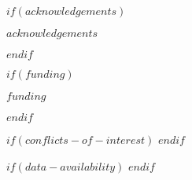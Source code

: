 $if(acknowledgements)$
\begin{acknowledgements}
$acknowledgements$
\end{acknowledgements}
$endif$

$if(funding)$
\begin{funding}
$funding$
\end{funding}
$endif$

$if(conflicts-of-interest)$
$endif$

$if(data-availability)$
$endif$
